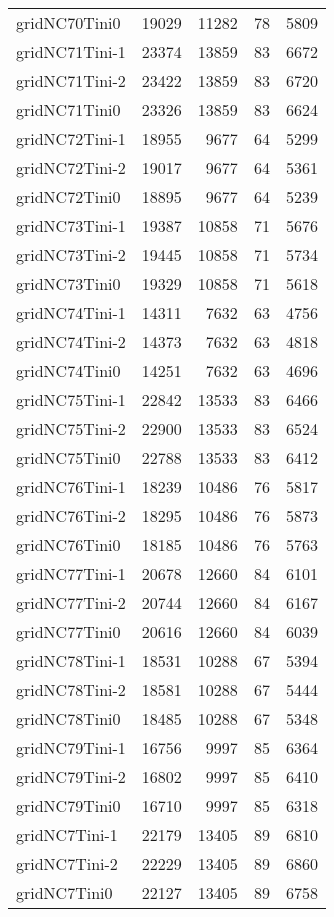\begin{longtable}{lrrrr}
gridNC70Tini0 & 19029 & 11282 & 78 & 5809 \\
gridNC71Tini-1 & 23374 & 13859 & 83 & 6672 \\
gridNC71Tini-2 & 23422 & 13859 & 83 & 6720 \\
gridNC71Tini0 & 23326 & 13859 & 83 & 6624 \\
gridNC72Tini-1 & 18955 & 9677 & 64 & 5299 \\
gridNC72Tini-2 & 19017 & 9677 & 64 & 5361 \\
gridNC72Tini0 & 18895 & 9677 & 64 & 5239 \\
gridNC73Tini-1 & 19387 & 10858 & 71 & 5676 \\
gridNC73Tini-2 & 19445 & 10858 & 71 & 5734 \\
gridNC73Tini0 & 19329 & 10858 & 71 & 5618 \\
gridNC74Tini-1 & 14311 & 7632 & 63 & 4756 \\
gridNC74Tini-2 & 14373 & 7632 & 63 & 4818 \\
gridNC74Tini0 & 14251 & 7632 & 63 & 4696 \\
gridNC75Tini-1 & 22842 & 13533 & 83 & 6466 \\
gridNC75Tini-2 & 22900 & 13533 & 83 & 6524 \\
gridNC75Tini0 & 22788 & 13533 & 83 & 6412 \\
gridNC76Tini-1 & 18239 & 10486 & 76 & 5817 \\
gridNC76Tini-2 & 18295 & 10486 & 76 & 5873 \\
gridNC76Tini0 & 18185 & 10486 & 76 & 5763 \\
gridNC77Tini-1 & 20678 & 12660 & 84 & 6101 \\
gridNC77Tini-2 & 20744 & 12660 & 84 & 6167 \\
gridNC77Tini0 & 20616 & 12660 & 84 & 6039 \\
gridNC78Tini-1 & 18531 & 10288 & 67 & 5394 \\
gridNC78Tini-2 & 18581 & 10288 & 67 & 5444 \\
gridNC78Tini0 & 18485 & 10288 & 67 & 5348 \\
gridNC79Tini-1 & 16756 & 9997 & 85 & 6364 \\
gridNC79Tini-2 & 16802 & 9997 & 85 & 6410 \\
gridNC79Tini0 & 16710 & 9997 & 85 & 6318 \\
gridNC7Tini-1 & 22179 & 13405 & 89 & 6810 \\
gridNC7Tini-2 & 22229 & 13405 & 89 & 6860 \\
gridNC7Tini0 & 22127 & 13405 & 89 & 6758 \\

\end{longtable}
